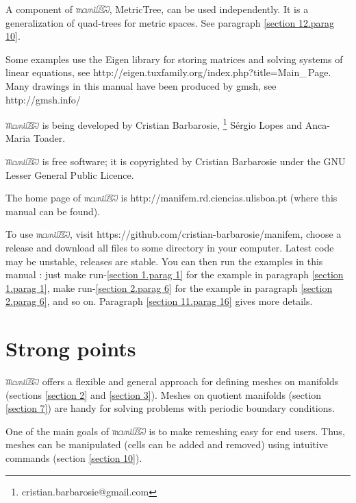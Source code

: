 \documentclass[a4paper]{scrreprt}
\def\numb{}
\newcommand\ManiFEM{\leavevmode\hbox{\includegraphics[width=13mm]{manifem-large}}}
\newcommand\maniFEM{\leavevmode\hbox{\includegraphics[width=13mm]{manifem-small}}}
\renewcommand\tt{\normalfont\ttfamily}
\begin{document}
A component of \maniFEM, {\small\tt MetricTree}, can be used independently.
It is a generalization of quad-trees for metric spaces.
See paragraph \ref{\numb section 12.\numb parag 10}.

Some examples use the {\tt Eigen} library for  storing matrices and solving systems of
linear equations, see {\small\tt http://eigen.tuxfamily.org/index.php?title=Main\_\,Page}.
Many drawings in this manual have been produced by {\tt gmsh}, see
{\small\tt http://gmsh.info/}

{\ManiFEM} is being developed by Cristian Barbarosie,%
\footnote {\small\tt cristian.barbarosie@gmail.com}
S\'ergio Lopes and Anca-Maria Toader.

{\ManiFEM} is free software; it is copyrighted by Cristian Barbarosie
under the GNU Lesser General Public Licence.

The home page of {\maniFEM} is {\small\tt http://manifem.rd.ciencias.ulisboa.pt}
(where this manual can be found).

To use \maniFEM, visit {\small\tt https://github.com/cristian-barbarosie/manifem},
choose a release and download all files to some directory in your computer.
Latest code may be unstable, releases are stable.
You can then run the examples in this manual :
just {\small\tt make run-\ref{\numb section 1.\numb parag 1}}
for the example in paragraph \ref{\numb section 1.\numb parag 1},
{\small\tt make run-\ref{\numb section 2.\numb parag 6}}
for the example in paragraph \ref{\numb section 2.\numb parag 6}, and so on.
Paragraph \ref{\numb section 11.\numb parag 16} gives more details.
\vfil\eject


\section*{Strong points}

{\ManiFEM} offers a flexible and general approach for defining meshes on manifolds
(sections \ref{\numb section 2} and \ref{\numb section 3}).
Meshes on quotient manifolds (section \ref{\numb section 7}) are handy for solving
problems with periodic boundary conditions.

One of the main goals of {\maniFEM} is to make remeshing easy for end users.
Thus, meshes can be manipulated (cells can be added and removed) using intuitive commands
(section \ref{\numb section 10}).
\end{document}
